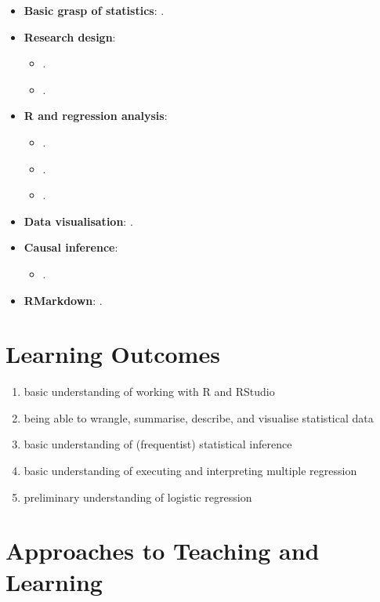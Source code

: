 \documentclass[abstract=on,parskip=full,headings=standardclasses,fontsize=11pt,paper=a4]{scrartcl}
\begin{document}
\begin{itemize}
\item \textbf{Basic grasp of statistics}: .
\item \textbf{Research design}: 
\begin{itemize}
\item {}.
\item {}.
\end{itemize}
\item \textbf{\textsf{R} and regression analysis}: 
\begin{itemize}
\item {}.
\item {}.
\item {}.
\end{itemize}
\item \textbf{Data visualisation}: .
\item \textbf{Causal inference}: 
\begin{itemize}
\item {}.
\end{itemize}
\item \textbf{RMarkdown}: .
\end{itemize}

\section*{Learning Outcomes}

\begin{enumerate}
\item basic understanding of working with \textsf{R} and RStudio
\item being able to wrangle, summarise, describe, and visualise statistical data
\item  basic understanding of (frequentist) statistical inference
\item  basic understanding of executing and interpreting multiple regression
\item  preliminary understanding of logistic regression
\end{enumerate}


\section*{Approaches to Teaching and Learning}
\end{document}
